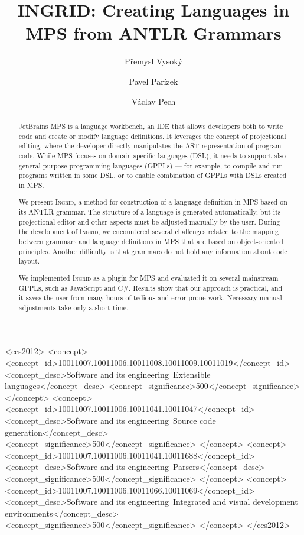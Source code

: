 \documentclass[sigplan,10pt,preprint]{acmart}
\begin{document}
\title{INGRID: Creating Languages in MPS from ANTLR Grammars}


\author{P\v{r}emysl Vysok\'y}

\author{Pavel Par\'izek}

\author{V\'aclav Pech}



\begin{abstract}
JetBrains MPS is a language workbench, an IDE that allows developers both to write code and create or modify language definitions.
It leverages the concept of projectional editing, where the developer directly manipulates the AST representation of program code.
While MPS focuses on domain-specific languages (DSL), it needs to support also general-purpose programming languages (GPPLs) --- for example, to compile and run programs written in some DSL, or to enable combination of GPPLs with DSLs created in MPS.

We present \textsc{Ingrid}, a method for construction of a language definition in MPS based on its ANTLR grammar.
The structure of a language is generated automatically, but its projectional editor and other aspects must be adjusted manually by the user.
During the development of \textsc{Ingrid}, we encountered several challenges related to the mapping between grammars and language definitions in MPS that are based on object-oriented principles.
Another difficulty is that grammars do not hold any information about code layout.

We implemented \textsc{Ingrid} as a plugin for MPS and evaluated it on several mainstream GPPLs, such as JavaScript and C\#.
Results show that our approach is practical, and it saves the user from many hours of tedious and error-prone work.
Necessary manual adjustments take only a short time.
\end{abstract}


 \begin{CCSXML}
<ccs2012>
<concept>
<concept_id>10011007.10011006.10011008.10011009.10011019</concept_id>
<concept_desc>Software and its engineering~Extensible languages</concept_desc>
<concept_significance>500</concept_significance>
</concept>
<concept>
<concept_id>10011007.10011006.10011041.10011047</concept_id>
<concept_desc>Software and its engineering~Source code generation</concept_desc>
<concept_significance>500</concept_significance>
</concept>
<concept>
<concept_id>10011007.10011006.10011041.10011688</concept_id>
<concept_desc>Software and its engineering~Parsers</concept_desc>
<concept_significance>500</concept_significance>
</concept>
<concept>
<concept_id>10011007.10011006.10011066.10011069</concept_id>
<concept_desc>Software and its engineering~Integrated and visual development environments</concept_desc>
<concept_significance>500</concept_significance>
</concept>
</ccs2012>
\end{CCSXML}
\end{document}

